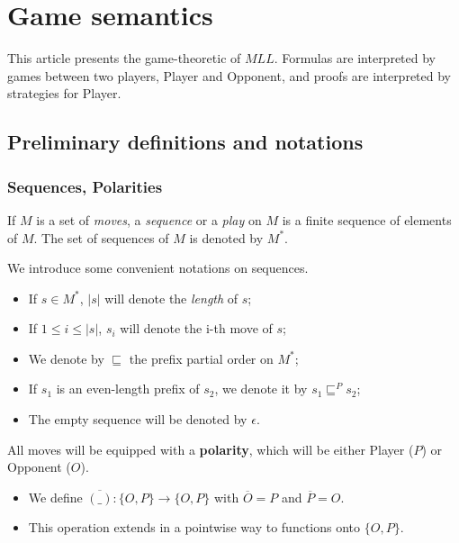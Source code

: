 \chapter{Game semantics}\label{game-semantics}

This article presents the game-theoretic  of \(MLL\). Formulas
are interpreted by games between two players, Player and Opponent, and
proofs are interpreted by strategies for Player.

\section{Preliminary definitions and notations}\label{preliminary-definitions-and-notations}

\subsection{Sequences, Polarities}\label{sequences-polarities}

\begin{definition}[Sequences]
If $M$ is a set of \emph{moves}, a \emph{sequence} or a \emph{play} on $M$ is a finite sequence of elements of $M$. The set of sequences of $M$ is denoted by $M^*$.
\end{definition}

We introduce some convenient notations on sequences.
\begin{itemize}
\item If \(s\in M^*\), \(|s|\) will denote the \emph{length} of \(s\);
\item If \(1\leq i\leq |s|\), \(s_i\) will denote the i-th move of \(s\);
\item We denote by \(\sqsubseteq\) the prefix partial order on \(M^*\);
\item If \(s_1\) is an even-length prefix of \(s_2\), we denote it by \(s_1\sqsubseteq^P s_2\);
\item The empty sequence will be denoted by \(\epsilon\).
\end{itemize}

All moves will be equipped with a \textbf{polarity}, which will be either Player (\(P\)) or Opponent (\(O\)).

\begin{itemize}
\item We define \(\overline{(\_)}:\{O,P\}\to \{O,P\}\) with \(\overline{O} = P\) and \(\overline{P} = O\).
\item This operation extends in a pointwise way to functions onto \(\{O,P\}\).
\end{itemize}

